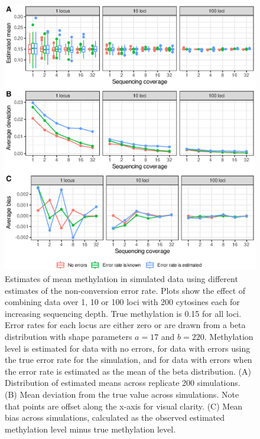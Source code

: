 \documentclass[twocolumn,twoside,lettersize]{article}
\begin{document}
\begin{figure}
  \begin{center}
    \includegraphics{figure3.eps}
    \caption{
        Estimates of mean methylation in simulated data using different estimates of the non-conversion error rate.
        Plots show the effect of combining data over 1, 10 or 100 loci with 200 cytosines each for increasing sequencing depth.
        True methylation is 0.15 for all loci.
        Error rates for each locus are either zero or are drawn from a beta distribution with shape parameters $a=17$ and $b=220$.
        Methylation level is estimated for data with no errors, for data with errors using the true error rate for the simulation, and for data with errors when the error rate is estimated as the mean of the beta distribution.
        (A) Distribution of estimated means across replicate 200 simulations.
        (B) Mean deviation from the true value across simulations.
        Note that points are offset along the x-axis for visual clarity.
        (C) Mean bias across simulations, calculated as the observed estimated methylation level minus true methylation level.
    }
    \label{fig:simulations}
  \end{center}
\end{figure}
\end{document}
